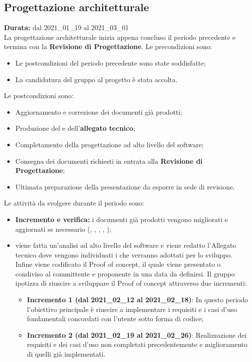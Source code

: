 \subsection{Progettazione architetturale}
\label{progettazione_architetturale}
\textbf{Durata:} dal 2021\_01\_19 al 2021\_03\_01\\
La progettazione architetturale inizia appena concluso il periodo precedente e termina con la \textbf{Revisione di Progettazione}.
Le precondizioni sono:
\begin{itemize}
    \item Le postcondizioni del periodo precedente sono state soddisfatte;
    \item La candidatura del gruppo al progetto {\NomeProgetto} è stata accolta.
\end{itemize}
Le postcondizioni sono:
\begin{itemize}
    \item Aggiornamento e correzione dei documenti già prodotti;
    \item Produzione del  e dell'\textbf{allegato tecnico};
    \item Completamento della progettazione ad alto livello del software;
    \item Consegna dei documenti richiesti in entrata alla \textbf{Revisione di Progettazione};
    \item Ultimata preparazione della presentazione da esporre in sede di revisione.
\end{itemize}
Le attività da svolgere durante il periodo sono:
\begin{itemize}
    \item \textbf{Incremento e verifica:} i documenti già prodotti vengono migliorati e aggiornati se necessario ({\NdP}, {\PdP}, {\Glossario}, {\PdQ}, {\AdR});
    \item {} viene fatta un'analisi ad alto livello del software e viene redatto l'Allegato tecnico dove vengono individuati i  che verranno adottati per lo sviluppo. Infine viene codificato il Proof of concept, il quale viene presentato o condiviso al committente e proponente in una data da definirsi. Il gruppo ipotizza di riuscire a sviluppare il Proof of concept attraverso due incrementi:
    \begin{itemize}
    	\item \textbf{Incremento 1 (dal 2021\_02\_12 al 2021\_02\_18)}: In questo periodo l'obiettivo principale è riuscire a implementare i requisiti e i casi d'uso fondamentali concordati con l'utente sotto forma di codice;
        \item \textbf{Incremento 2 (dal 2021\_02\_19 al 2021\_02\_26)}: Realizzazione dei requisiti e dei casi d'uso non completati precedentemente e miglioramento di quelli già implementati.
    \end{itemize}
\end{itemize}
\newpage
